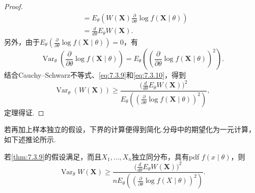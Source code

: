 \begin{proof}
\begin{equation}
\begin{aligned}
&=E_\theta\left(W(\boldsymbol X)\frac\partial{\partial\theta}\log f(\boldsymbol X\mid\theta)\right)\\
&=\frac d{d\theta}E_\theta W(\boldsymbol X).
\end{aligned}
\end{equation}
另外，由于$E_\theta(\frac\partial{\partial\theta}\log f(\boldsymbol X\mid\theta))=0$，有
\begin{equation}\label{eq:7.3.10}
\operatorname{Var}_\theta\left(\frac\partial{\partial\theta}\log f(\boldsymbol X\mid\theta)\right)=E_\theta\left(\left(\frac\partial{\partial\theta}\log f(\boldsymbol X\mid\theta)\right)^2\right).
\end{equation}
结合Cauchy--Schwarz不等式、\eqref{eq:7.3.9}和\eqref{eq:7.3.10}，得到
$$\operatorname{Var}_\theta(W(\boldsymbol X))\ge\frac{\bigl(\frac d{d\theta}E_\theta W(\boldsymbol X)\bigr)^2}{E_\theta\left(\left(\frac\partial{\partial\theta}\log f(\boldsymbol X\mid\theta)\right)^2\right)},$$
定理得证.
\end{proof}
若再加上样本独立的假设，下界的计算便得到简化.分母中的期望化为一元计算，如下述推论所示.
\begin{corollary}\label{cor:7.3.10}
若\autoref{thm:7.3.9}的假设满足，而且$X_1,\ldots,X_n$独立同分布，具有pdf $f(x\mid\theta)$，则
$$\operatorname{Var}_\theta W(\boldsymbol X)\ge\frac{\bigl(\frac d{d\theta}E_\theta W(\boldsymbol X)\bigr)^2}{nE_\theta\left(\left(\frac\partial{\partial\theta}\log f(X\mid\theta)\right)^2\right)}.$$
\end{corollary}
